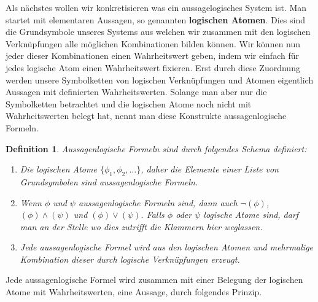 \documentclass[11pt,a4paper,leqno]{report}
\newtheorem{definition}[theorem]{Definition}
\numberwithin{equation}{chapter}
\begin{document}
Als n\"achstes wollen wir konkretisieren was ein aussagelogisches System ist. Man startet mit elementaren Aussagen, so genannten \textbf{logischen Atomen}. Dies sind die Grundsymbole unseres Systems aus welchen wir zusammen mit den logischen Verkn\"upfungen alle m\"oglichen Kombinationen bilden k\"onnen. 
Wir k\"onnen nun jeder dieser Kombinationen einen Wahrheitswert geben, indem wir einfach f\"ur jedes logische Atom einen Wahrheitswert fixieren.
Erst durch diese Zuordnung werden unsere Symbolketten von logischen Verkn\"upfungen und Atomen eigentlich Aussagen mit definierten Wahrheitswerten.
Solange man aber nur die Symbolketten betrachtet und die logischen Atome noch nicht mit Wahrheitswerten belegt hat, nennt man diese Konstrukte aussagenlogische Formeln.
\begin{definition}
	Aussagenlogische Formeln sind durch folgendes Schema definiert:
	\begin{enumerate}
		\item Die logischen Atome $\{\phi_1, \phi_2, \dots\}$, daher die Elemente einer Liste von Grundsymbolen sind aussagenlogische Formeln.
		\item Wenn $\phi$ und $\psi$ aussagenlogische Formeln sind, dann auch $\neg(\phi)$, $(\phi)\wedge(\psi)$ und $(\phi)\vee(\psi)$. Falls $\phi$ oder $\psi$ logische Atome sind, darf man an der Stelle wo dies zutrifft die Klammern hier weglassen.
		\item Jede aussagenlogische Formel wird aus den logischen Atomen und mehrmalige Kombination dieser durch logische Verkn\"upfungen erzeugt.
	\end{enumerate}
	
\end{definition}
Jede aussagenlogische Formel wird zusammen mit einer Belegung der logischen Atome mit Wahrheitswerten, eine Aussage, durch folgendes Prinzip.
\end{document}
